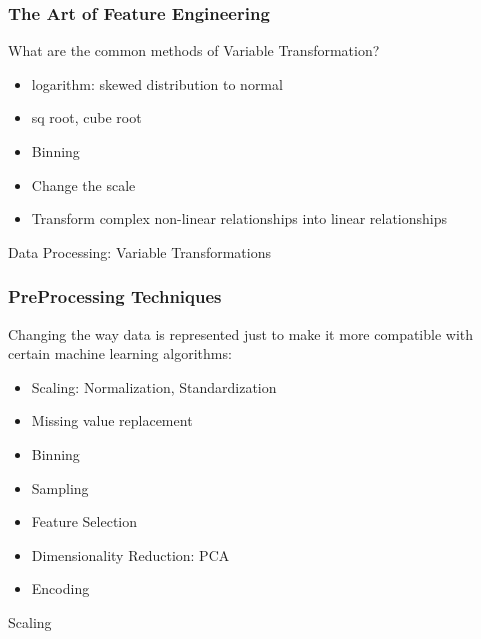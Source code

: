 \begin{frame}[fragile]\frametitle{The Art of Feature Engineering}
What are the common methods of Variable Transformation? 
	\begin{itemize}
	\item logarithm: skewed distribution to normal
	\item sq root, cube root
	\item Binning
	\item Change the scale
\item  Transform complex non-linear relationships into linear relationships
	\end{itemize}
	
	
\end{frame}


\begin{frame}
  \begin{center}
    {\Large Data Processing: Variable Transformations}
  \end{center}
\end{frame}



\begin{frame}[fragile]\frametitle{PreProcessing Techniques}
Changing the way data is represented just to make it more compatible with certain machine learning algorithms:

\begin{itemize}
\item Scaling: Normalization, Standardization 
\item Missing value replacement
\item Binning 
\item Sampling 
\item Feature Selection
\item Dimensionality Reduction: PCA
\item Encoding
\end{itemize}
\end{frame}


\begin{frame}
  \begin{center}
    {\Large Scaling}
  \end{center}
\end{frame}

